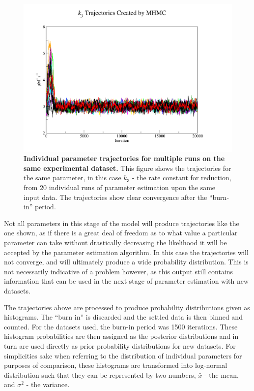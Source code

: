 \begin{figure}[tbp]
 \centering
 \includegraphics[width=14cm, trim=75px 50px 125px 25px]{./05-oxygenreduction/data/k3s1.pdf}
 \caption[Individual parameter trajectories for multiple runs on the same experimental dataset]{{\bf Individual parameter trajectories for multiple runs on the same experimental dataset.} This figure shows the trajectories for the same parameter, in this case $k_3$ - the rate constant for \cbbthree{} reduction, from 20 individual runs of parameter estimation upon the same input data. The trajectories show clear convergence after the ``burn-in'' period.
 \label{fig:k3s}}
\end{figure}

Not all parameters in this stage of the model will produce trajectories like the one shown, as if there is a great deal of freedom as to what value a particular parameter can take without drastically decreasing the likelihood it will be accepted by the parameter estimation algorithm. In this case the trajectories will not converge, and will ultimately produce a wide probability distribution. This is not necessarily indicative of a problem however, as this output still contains information that can be used in the next stage of parameter estimation with new datasets.

The trajectories above are processed to produce probability distributions given as histograms. The ``burn in'' is discarded and the settled data is then binned and counted. For the datasets used, the burn-in period was 1500 iterations. These histogram probabilities are then assigned as the posterior distributions and in turn are used directly as prior probability distributions for new datasets. For simplicities sake when referring to the distribution of individual parameters for purposes of comparison, these histograms are transformed into log-normal distribution such that they can be represented by two numbers, $\bar{x}$ - the mean, and $\sigma^2$ - the variance.

